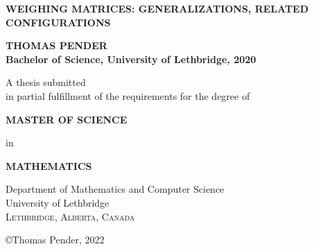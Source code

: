 \documentclass[../main]{subfiles}
\begin{document}
\begin{center}

\thispagestyle{empty}

\begin{large}
\MakeUppercase{\bf Weighing Matrices: Generalizations, related configurations}
\end{large}

\vspace{1.25in}

\begin{large}
 {\bf \MakeUppercase{Thomas Pender}\\Bachelor of Science, University of Lethbridge, 2020} 
\end{large}

\vspace{1.25in}

A thesis submitted\\in partial fulfillment of the requirements for the degree of

\vspace{0.25in}

\begin{large}
 \MakeUppercase{\bf Master of Science}
\end{large}

\vspace{0.25in}

in

\vspace{0.25in}

\begin{large}
 \MakeUppercase{\bf Mathematics} 
\end{large}

\vspace{1.25in}

Department of Mathematics and Computer Science\\University of Lethbridge\\\textsc{Lethbridge, Alberta, Canada}

\vspace{1in}

\copyright Thomas Pender, 2022

\end{center}

\newpage
\blankpage
\end{document}
